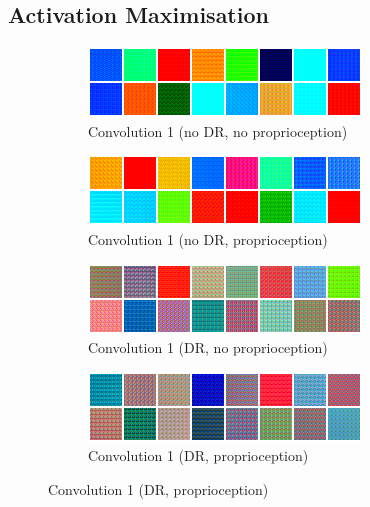 \hypertarget{activation-maximisation-1}{%
\subsection{Activation Maximisation}\label{activation-maximisation-1}}

\label{sec:activation_maximisation}

\begin{figure}
  \centering
  \begin{subfigure}{0.49\textwidth}
    \includegraphics[width=\textwidth]{figures/chapter6/act_max/fetch_nodr_noprop_conv1}
    \caption{Convolution 1 (no DR, no proprioception)}
  \end{subfigure}
  \begin{subfigure}{0.49\textwidth}
    \includegraphics[width=\textwidth]{figures/chapter6/act_max/fetch_nodr_prop_conv1}
    \caption{Convolution 1 (no DR, proprioception)}
  \end{subfigure}

  \begin{subfigure}{0.49\textwidth}
    \includegraphics[width=\textwidth]{figures/chapter6/act_max/fetch_dr_noprop_conv1}
    \caption{Convolution 1 (DR, no proprioception)}
  \end{subfigure}
  \begin{subfigure}{0.49\textwidth}
    \includegraphics[width=\textwidth]{figures/chapter6/act_max/fetch_dr_prop_conv1}
    \caption{Convolution 1 (DR, proprioception)}
  \end{subfigure}


\end{figure}
